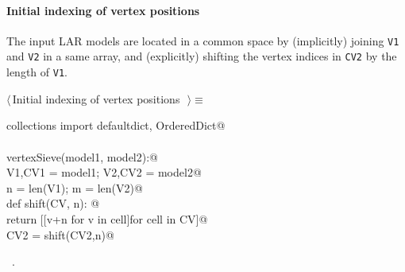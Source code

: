 \documentclass[11pt,oneside]{article}	%
\begin{document}
\paragraph{Initial indexing of vertex positions}
The input LAR models are located in a common space by (implicitly) joining \texttt{V1} and \texttt{V2} in a same array, and (explicitly) shifting the vertex indices in \texttt{CV2} by the length of \texttt{V1}.
\begin{flushleft} \small \label{scrap3}
$\langle\,$Initial indexing of vertex positions\nobreak\ {\footnotesize {}}$\,\rangle\equiv$
\vspace{-1ex}
\begin{list}{}{} \item
\mbox{}\verb@from collections import defaultdict, OrderedDict@\\
\mbox{}\verb@@\\
\mbox{}\verb@def vertexSieve(model1, model2):@\\
\mbox{}\verb@   V1,CV1 = model1; V2,CV2 = model2@\\
\mbox{}\verb@   n = len(V1); m = len(V2)@\\
\mbox{}\verb@   def shift(CV, n): @\\
\mbox{}\verb@      return [[v+n for v in cell]for cell in CV]@\\
\mbox{}\verb@   CV2 = shift(CV2,n)@\\
\mbox{}\verb@@{\NWsep}
\end{list}
\vspace{-1ex}
\footnotesize\addtolength{\baselineskip}{-1ex}
\begin{list}{}{\setlength{\itemsep}{-\parsep}\setlength{\itemindent}{-\leftmargin}}
\item \NWtxtMacroRefIn\ .
\end{list}
\end{flushleft}
\end{document}
